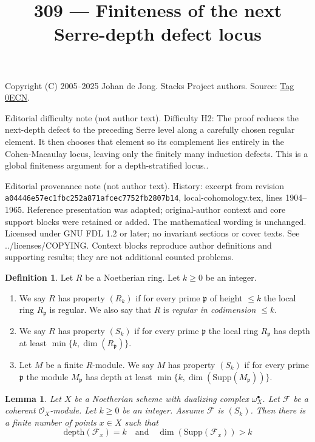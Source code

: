 \documentclass{amsart}
\theoremstyle{plain}
\newtheorem{lemma}[subsection]{Lemma}
\theoremstyle{definition}
\newtheorem{definition}[subsection]{Definition}
\theoremstyle{remark}
\numberwithin{equation}{subsection}
\begin{document}
\title[Stacks Project, Tag 0ECN]{309 --- Finiteness of the next Serre-depth defect locus}
\maketitle
\noindent Copyright (C) 2005--2025 Johan de Jong. Stacks Project authors. Source: \href{https://stacks.math.columbia.edu/tag/0ECN}{Tag 0ECN}.

\noindent Editorial difficulty note (not author text). Difficulty H2: The proof reduces the next-depth defect to the preceding Serre level along a carefully chosen regular element. It then chooses that element so its complement lies entirely in the Cohen-Macaulay locus, leaving only the finitely many induction defects. This is a global finiteness argument for a depth-stratified locus..

\noindent Editorial provenance note (not author text). History: excerpt from revision \texttt{a0444\allowbreak 6e57e\allowbreak c1fbc\allowbreak 252a8\allowbreak 71afc\allowbreak ec775\allowbreak 2fb28\allowbreak 07b14}, local-cohomology.tex, lines 1904--1965. Reference presentation was adapted; original-author context and core support blocks were retained or added. The mathematical wording is unchanged. Licensed under GNU FDL 1.2 or later; no invariant sections or cover texts. See ../licenses/COPYING. Context blocks reproduce author definitions and supporting results; they are not additional counted problems.

\begin{definition}
\label{algebra-definition-conditions}
Let $R$ be a Noetherian ring.
Let $k \geq 0$ be an integer.
\begin{enumerate}
\item We say $R$ has property {\it $(R_k)$} if for every prime $\mathfrak p$
of height $\leq k$ the local ring $R_{\mathfrak p}$ is regular.
We also say that $R$ is {\it regular in codimension $\leq k$}.
\item We say $R$ has property {\it $(S_k)$} if for every prime $\mathfrak p$
the local ring $R_{\mathfrak p}$ has depth at least
$\min\{k, \dim(R_{\mathfrak p})\}$.
\item Let $M$ be a finite $R$-module. We say $M$ has property $(S_k)$
if for every prime $\mathfrak p$ the module
$M_{\mathfrak p}$ has depth at least
$\min\{k, \dim(\text{Supp}(M_{\mathfrak p}))\}$.
\end{enumerate}
\end{definition}

\begin{lemma}
\label{lemma-finite-nr-points-next-S}
Let $X$ be a Noetherian scheme with dualizing complex $\omega_X^\bullet$.
Let $\mathcal{F}$ be a coherent $\mathcal{O}_X$-module. Let $k \geq 0$
be an integer. Assume $\mathcal{F}$ is $(S_k)$.
Then there is a finite number of points $x \in X$ such that
$$
\text{depth}(\mathcal{F}_x) = k
\quad\text{and}\quad
\dim(\text{Supp}(\mathcal{F}_x)) > k
$$
\end{lemma}
\end{document}
